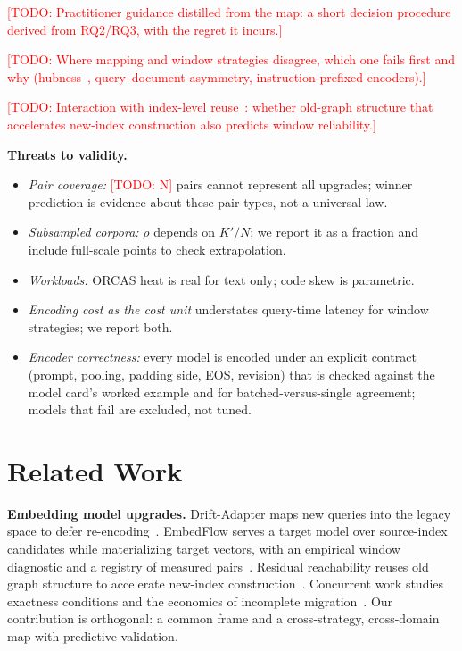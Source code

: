 \documentclass[conference]{IEEEtran}
\newcommand{\todo}[1]{\textcolor{red}{[TODO: #1]}}
\begin{document}
\todo{Practitioner guidance distilled from the map: a short decision procedure
derived from RQ2/RQ3, with the regret it incurs.}

\todo{Where mapping and window strategies disagree, which one fails first and why
(hubness~\cite{hubness}, query--document asymmetry, instruction-prefixed encoders).}

\todo{Interaction with index-level reuse~\cite{dgm}: whether old-graph structure that
accelerates new-index construction also predicts window reliability.}

\textbf{Threats to validity.}
\begin{itemize}
\item \emph{Pair coverage:} \todo{N} pairs cannot represent all upgrades; winner prediction is
evidence about these pair types, not a universal law.
\item \emph{Subsampled corpora:} $\rho$ depends on $K'/N$; we report it as a fraction and
include full-scale points to check extrapolation.
\item \emph{Workloads:} ORCAS heat is real for text only; code skew is parametric.
\item \emph{Encoding cost as the cost unit} understates query-time latency for window
strategies; we report both.
\item \emph{Encoder correctness:} every model is encoded under an explicit contract (prompt,
pooling, padding side, EOS, revision) that is checked against the model card's worked
example and for batched-versus-single agreement; models that fail are excluded, not tuned.
\end{itemize}

\section{Related Work}\label{sec:related}

\textbf{Embedding model upgrades.} Drift-Adapter maps new queries into the legacy
space to defer re-encoding~\cite{drift-adapter}. EmbedFlow serves a target model over
source-index candidates while materializing target vectors, with an empirical
window diagnostic and a registry of measured pairs~\cite{embedflow}. Residual
reachability reuses old graph structure to accelerate new-index construction~\cite{dgm}.
Concurrent work studies exactness conditions and the economics of incomplete
migration~\cite{thaw-anon}. Our contribution is orthogonal: a common frame and a
cross-strategy, cross-domain map with predictive validation.
\end{document}
